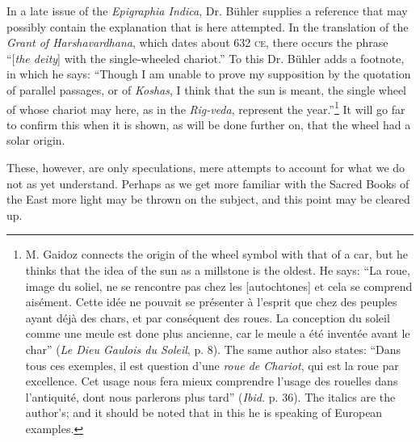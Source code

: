 \documentclass[a4paper, 11pt, oneside, polutonikogreek, english]{article}
\begin{document}
In a late issue of the \emph{Epigraphia Indica}, Dr. Bühler supplies a reference that may possibly contain the explanation that is here attempted. In the translation of the \emph{Grant of Harshavardhana}, which dates about 632 \textsc{ce}, there occurs the phrase ``[\emph{the deity}] with the single-wheeled chariot.'' To this Dr. Bühler adds a footnote, in which he says: ``Though I am unable to prove my supposition by the quotation of parallel passages, or of \emph{Koshas}, I think that the sun is meant, the single wheel of whose chariot may here, as in the \emph{Rig-veda}, represent the year.''\footnote{M. Gaidoz connects the origin of the wheel symbol with that of a car, but he thinks that the idea of the sun as a millstone is the oldest. He says: ``La roue, image du soliel, ne se rencontre pas chez les [autochtones] et cela se comprend aisément. Cette idée ne pouvait se présenter à l'esprit que chez des peuples ayant déjà des chars, et par conséquent des roues. La conception du soleil comme une meule est done plus ancienne, car le meule a été inventée avant le char'' (\emph{Le Dieu Gaulois du Soleil}, p. 8). The same author also states: ``Dans tous ces exemples, il est question d'une \emph{roue de Chariot}, qui est la roue par excellence. Cet usage nous fera mieux comprendre l'usage des rouelles dans l'antiquité, dont nous parlerons plus tard'' (\emph{Ibid.} p. 36). The italics are the author's; and it should be noted that in this he is speaking of European examples.} It will go far to confirm this when it is shown, as will be done further on, that the wheel had a solar origin.

These, however, are only speculations, mere attempts to account for what we do not as yet understand. Perhaps as we get more familiar with the Sacred Books of the East more light may be thrown on the subject, and this point may be cleared up.
\end{document}
